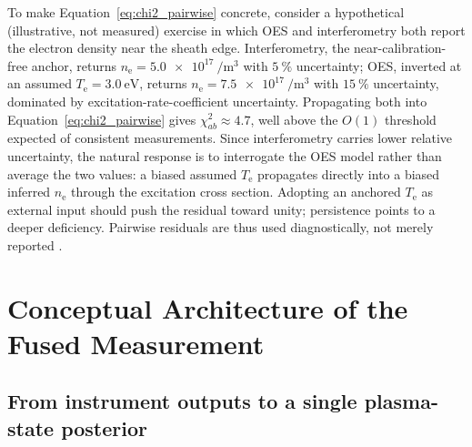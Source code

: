 To make Equation~\eqref{eq:chi2_pairwise} concrete, consider a hypothetical (illustrative, not measured) exercise in which OES and interferometry both report the electron density near the sheath edge. Interferometry, the near-calibration-free anchor, returns $n_{\mathrm{e}} = \SI{5.0e17}{\per\cubic\meter}$ with $\SI{5}{\percent}$ uncertainty; OES, inverted at an assumed $T_{\mathrm{e}} = \SI{3.0}{\electronvolt}$, returns $n_{\mathrm{e}} = \SI{7.5e17}{\per\cubic\meter}$ with $\SI{15}{\percent}$ uncertainty, dominated by excitation-rate-coefficient uncertainty. Propagating both into Equation~\eqref{eq:chi2_pairwise} gives $\chi^{2}_{ab} \approx 4.7$, well above the $O(1)$ threshold expected of consistent measurements. Since interferometry carries lower relative uncertainty, the natural response is to interrogate the OES model rather than average the two values: a biased assumed $T_{\mathrm{e}}$ propagates directly into a biased inferred $n_{\mathrm{e}}$ through the excitation cross section. Adopting an anchored $T_{\mathrm{e}}$ as external input should push the residual toward unity; persistence points to a deeper deficiency. Pairwise residuals are thus used diagnostically, not merely reported \cite{ref0355}.

\section{Conceptual Architecture of the Fused Measurement}
\label{sec:architecture}

\subsection{From instrument outputs to a single plasma-state posterior}


